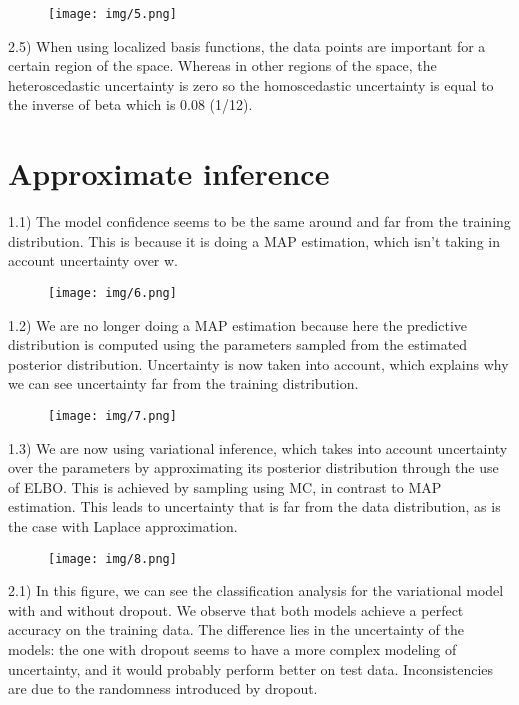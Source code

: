 \begin{figure}[H]
  \centering
    \texttt{[image: img/5.png]}
\end{figure}

2.5) When using localized basis functions, the data points are important for a certain region of the space. Whereas in other regions of the space, the heteroscedastic uncertainty is zero so the homoscedastic uncertainty is equal to the inverse of beta which is 0.08 (1/12).

\section{Approximate inference}

1.1) The model confidence seems to be the same around and far from the training distribution. This is because it is doing a MAP estimation, which isn't taking in account uncertainty over w.

\begin{figure}[H]
  \centering
    \texttt{[image: img/6.png]}
\end{figure}

1.2) We are no longer doing a MAP estimation because here the predictive distribution is computed using the parameters sampled from the estimated posterior distribution. Uncertainty is now taken into account, which explains why we can see uncertainty far from the training distribution.

\begin{figure}[H]
\centering
\texttt{[image: img/7.png]}
\end{figure}

1.3) We are now using variational inference, which takes into account uncertainty over the parameters by approximating its posterior distribution through the use of ELBO. This is achieved by sampling using MC, in contrast to MAP estimation. This leads to uncertainty that is far from the data distribution, as is the case with Laplace approximation.

\begin{figure}[H]
\centering
\texttt{[image: img/8.png]}
\end{figure}

2.1) In this figure, we can see the classification analysis for the variational model with and without dropout. We observe that both models achieve a perfect accuracy on the training data. The difference lies in the uncertainty of the models: the one with dropout seems to have a more complex modeling of uncertainty, and it would probably perform better on test data. Inconsistencies are due to the randomness introduced by dropout.

